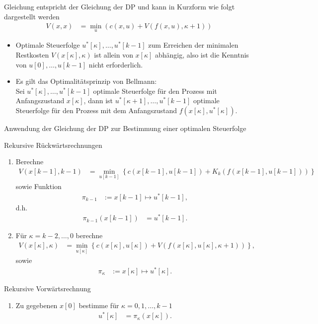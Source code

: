 Gleichung  entspricht der Gleichung der \ac{DP} und kann in Kurzform wie folgt dargestellt werden
\begin{align}
	V(x,x) & = \min\limits_u\left(c(x,u)+V\left(f(x,u),\kappa +1 \right) \right)
\end{align}
\begin{remark}\hspace{1mm}
\begin{itemize}
  \item Optimale Steuerfolge $u^{\ast}[\kappa],\ldots,u^{\ast}[k-1]$ zum Erreichen der minimalen Restkosten $V\left(x[\kappa],\kappa \right)$ ist allein von $x[\kappa]$ abhängig, also
  ist die Kenntnis von $u[0],\ldots,u[k-1]$ nicht erforderlich.
  \item Es gilt das Optimalitätsprinzip von Bellmann:\\
  	Sei $u^{\ast}[\kappa],\ldots,u^{\ast}[k-1]$ optimale Steuerfolge für den Prozess mit Anfangszustand $x[\kappa]$, dann ist $u^{\ast}[\kappa+1],\ldots,u^{\ast}[k-1]$ optimale
  	Steuerfolge für den Prozess mit dem Anfangszustand $f\left(x[\kappa],u^{\ast}[\kappa] \right)$.
\end{itemize}
\end{remark}
Anwendung der Gleichung der \ac{DP} zur Bestimmung einer optimalen Steuerfolge

Rekursive Rückwärtsrechnungen
\begin{enumerate}[label=(S\arabic*)]
  \item Berechne
  \begin{align*}
  	V\left(x[k-1],k-1 \right) & = \min\limits_{u[k-1]}\left\{c(x[k-1],u[k-1]) + K_k\left(f(x[k-1],u[k-1]) \right) \right\}
  \end{align*}
  sowie Funktion
  \begin{align*}
  	\pi_{k-1} & := x[k-1]\mapsto u^{\ast}[k-1],
  \end{align*}
  d.h. 
  \begin{align*}
  	\pi_{k-1}\left(x[k-1] \right) & = u^{\ast}[k-1].
  \end{align*}
  \item Für $\kappa=k-2,\ldots,0$ berechne 
  \begin{align*}
  	V\left(x[\kappa],\kappa \right) & = \min\limits_{u[\kappa]}\left\{c\left(x[\kappa],u[\kappa] \right) + V\left(f(x[\kappa],u[\kappa],\kappa +1) \right) \right\},
  \end{align*}
  sowie
  \begin{align*}
  	\pi_{\kappa} & := x[\kappa]\mapsto u^{\ast}[\kappa].
  \end{align*}
\end{enumerate}
Rekursive Vorwärtsrechnung
\begin{enumerate}[label=(S\arabic*),resume] 
  \item Zu gegebenen $x[0]$ bestimme für $\kappa=0,1,\ldots,k-1$
  \begin{align*}
  	u^{\ast}[\kappa] & = \pi_{\kappa}(x[\kappa]).
  \end{align*}
\end {enumerate} 

